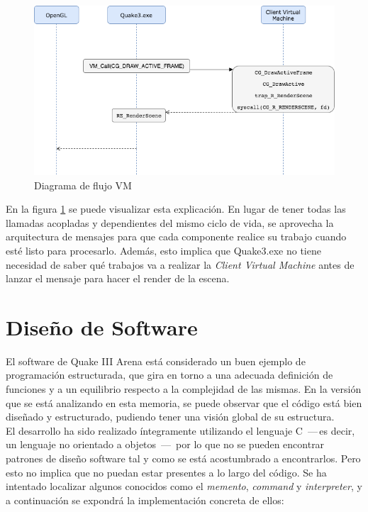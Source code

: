 \documentclass[a4paper,12pt]{report}
\begin{document}
    \begin{center}
    	\begin{figure}[h]
    		\includegraphics[width=1\textwidth]{images/diagrama.png}
    		\caption{Diagrama de flujo VM}
    		\label{figdiagrama}
    	\end{figure}
    \end{center}
    
    En la figura \ref{figdiagrama} se puede visualizar esta explicación. En lugar de tener todas las llamadas acopladas y dependientes del mismo ciclo de vida, se aprovecha la arquitectura de mensajes para que cada componente realice su trabajo cuando esté listo para procesarlo. Además, esto implica que Quake3.exe no tiene necesidad de saber qué trabajos va a realizar la \textit{Client Virtual Machine} antes de lanzar el mensaje para hacer el render de la escena.\\
    
    

  
	
	
	\newpage
	\section{Diseño de Software}
	

	
	El software de Quake III Arena está considerado un buen ejemplo de programación estructurada, que gira en torno a una adecuada definición de funciones y a un equilibrio respecto a la complejidad de las mismas. En la versión que se está analizando en esta memoria, se puede observar que el código está bien diseñado y estructurado, pudiendo tener una visión global de su estructura.\\
	
	El desarrollo ha sido realizado íntegramente utilizando el lenguaje C \,---\,es decir, un lenguaje no orientado a objetos \,---\, por lo que no se pueden encontrar patrones de diseño software tal y como se está acostumbrado a encontrarlos. Pero esto no implica que no puedan estar presentes a lo largo del código. Se ha intentado localizar algunos conocidos como el \textit{memento}, \textit{command} y \textit{interpreter}, y a continuación se expondrá la implementación concreta de ellos:\\
	
\end{document}

